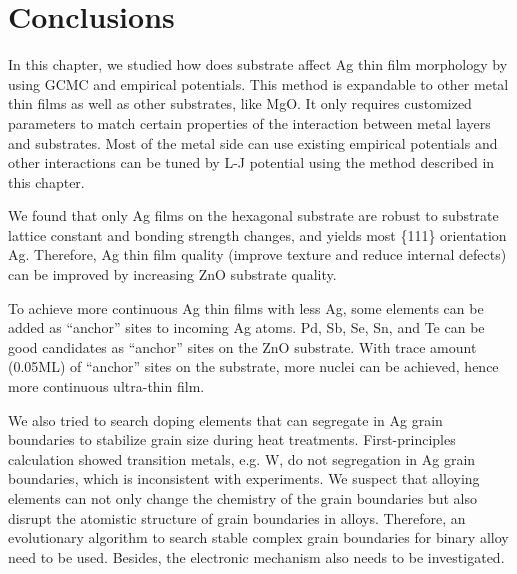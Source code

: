 \section{Conclusions}
In this chapter, we studied how does substrate affect Ag thin film morphology by using \ac{GCMC} and empirical potentials. This method is expandable to other metal thin films as well as other substrates, like MgO. It only requires customized parameters to match certain properties of the interaction between metal layers and substrates. Most of the metal side can use existing empirical potentials and other interactions can be tuned by L-J potential using the method described in this chapter.

We found that only Ag films on the hexagonal substrate are robust to substrate lattice constant and bonding strength changes, and yields most \{111\} orientation Ag. Therefore, Ag thin film quality (improve texture and reduce internal defects) can be improved by increasing ZnO substrate quality.

To achieve more continuous Ag thin films with less Ag, some elements can be added as ``anchor'' sites to incoming Ag atoms. Pd, Sb, Se, Sn, and Te can be good candidates as ``anchor'' sites on the ZnO substrate. With trace amount (0.05\ac{ML}) of ``anchor'' sites on the substrate, more nuclei can be achieved, hence more continuous ultra-thin film.

We also tried to search doping elements that can segregate in Ag grain boundaries to stabilize grain size during heat treatments. First-principles calculation showed transition metals, e.g. W, do not segregation in Ag grain boundaries, which is inconsistent with experiments. We suspect that alloying elements can not only change the chemistry of the grain boundaries but also disrupt the atomistic structure of grain boundaries in alloys. Therefore, an evolutionary algorithm to search stable complex grain boundaries for binary alloy need to be used. Besides, the electronic mechanism also needs to be investigated.
